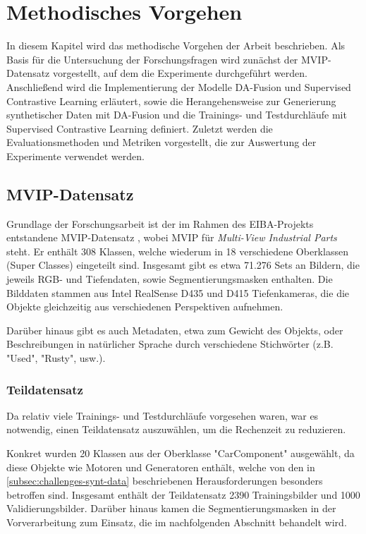 \chapter{Methodisches Vorgehen} \label{ch:methodology}

In diesem Kapitel wird das methodische Vorgehen der Arbeit beschrieben. Als Basis für die Untersuchung der Forschungsfragen wird zunächst der MVIP-Datensatz vorgestellt, auf dem die Experimente durchgeführt werden. Anschließend wird die Implementierung der Modelle DA-Fusion und Supervised Contrastive Learning erläutert, sowie die Herangehensweise zur Generierung synthetischer Daten mit DA-Fusion und die Trainings- und Testdurchläufe mit Supervised Contrastive Learning definiert. Zuletzt werden die Evaluationsmethoden und Metriken vorgestellt, die zur Auswertung der Experimente verwendet werden.

\section{MVIP-Datensatz} \label{sec:dataset}

Grundlage der Forschungsarbeit ist der im Rahmen des EIBA-Projekts entstandene MVIP-Datensatz \parencite{Koch2023mvip}, wobei MVIP für \textit{Multi-View Industrial Parts} steht. Er enthält 308 Klassen, welche wiederum in 18 verschiedene Oberklassen (Super Classes) eingeteilt sind. Insgesamt gibt es etwa 71.276 Sets an Bildern, die jeweils RGB- und Tiefendaten, sowie Segmentierungsmasken enthalten. Die Bilddaten stammen aus Intel RealSense D435 und D415 Tiefenkameras, die die Objekte gleichzeitig aus verschiedenen Perspektiven aufnehmen.

Darüber hinaus gibt es auch Metadaten, etwa zum Gewicht des Objekts, oder Beschreibungen in natürlicher Sprache durch verschiedene Stichwörter (z.B. "Used", "Rusty", usw.).

\subsection{Teildatensatz} \label{subsec:subdataset}

Da relativ viele Trainings- und Testdurchläufe vorgesehen waren, war es notwendig, einen Teildatensatz auszuwählen, um die Rechenzeit zu reduzieren.

Konkret wurden 20 Klassen aus der Oberklasse "CarComponent" ausgewählt, da diese Objekte wie Motoren und Generatoren enthält, welche von den in \autoref{subsec:challenges-synt-data} beschriebenen Herausforderungen besonders betroffen sind. Insgesamt enthält der Teildatensatz 2390 Trainingsbilder und 1000 Validierungsbilder. Darüber hinaus kamen die Segmentierungsmasken in der Vorverarbeitung zum Einsatz, die im nachfolgenden Abschnitt behandelt wird. %

